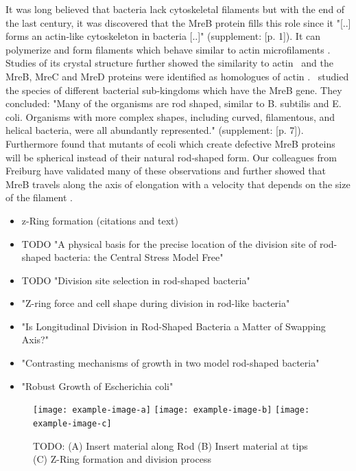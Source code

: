 \documentclass{article}
\begin{document}
It was long believed that bacteria lack cytoskeletal filaments but with the end of the last
century, it was discovered that the MreB protein fills this role since it "[..] forms an actin-like
cytoskeleton in bacteria [..]" \cite{Erickson2001} (supplement: [p. 1]).
It can polymerize and form filaments which behave similar to actin microfilaments \cite{Dersch2020}.
Studies of its crystal structure further showed the similarity to actin~\cite{vandenEnt2001} and the
MreB, MreC and MreD proteins were identified as homologues of actin \cite{Lowe2017_lj}.\
\cite{Jones2001} studied the species of different bacterial sub-kingdoms which have the MreB gene.
They concluded: "Many of the organisms are rod shaped, similar to B. subtilis and E. coli.
Organisms with more complex shapes, including curved, filamentous, and helical bacteria, were all
abundantly represented." \cite{Jones2001} (supplement: [p. 7]).
Furthermore \cite{Wachi1987} found that mutants of \ac{ecoli} which create defective MreB proteins will be
spherical instead of their natural rod-shaped form.
Our colleagues from Freiburg have validated many of these observations and further showed that MreB
travels along the axis of elongation with a velocity that depends on the size of the filament
\cite{Olshausen2013}.

\begin{itemize}
    \item z-Ring formation (citations and text)
    \item \cite{Koch1995} TODO "A physical basis for the precise location of the division site of rod-shaped bacteria: the Central Stress Model Free"
    \item \cite{Bramkamp2009} TODO "Division site selection in rod-shaped bacteria"
    \item \cite{Lan2007} "Z-ring force and cell shape during division in rod-like bacteria"
    \item \cite{denBlaauwen2018} "Is Longitudinal Division in Rod-Shaped Bacteria a Matter of
        Swapping Axis?"
    \item \cite{Billaudeau2017} "Contrasting mechanisms of growth in two model rod-shaped bacteria"
    \item \cite{Wang2010_2} "Robust Growth of Escherichia coli"
\end{itemize}

\begin{figure}[H]
    \centering
    \texttt{[image: example-image-a]}
    \texttt{[image: example-image-b]}
    \texttt{[image: example-image-c]}
    \caption{TODO:
        (A) Insert material along Rod
        (B) Insert material at tips
        (C) Z-Ring formation and division process
    }
\end{figure}
\end{document}
